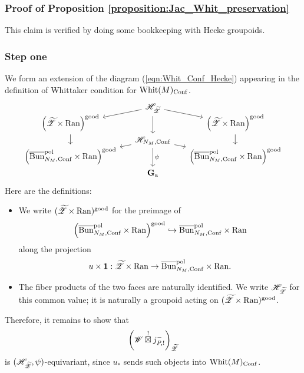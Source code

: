 \subsubsection{Proof of Proposition \ref{proposition:Jac_Whit_preservation}} This claim is verified by doing some bookkeeping with Hecke groupoids.

\subsubsection{Step one} We form an extension of the diagram (\ref{eqn:Whit_Conf_Hecke}) appearing in the definition of Whittaker condition for $\mathrm{Whit}(M)_{\mathrm{Conf}}$.
\[
\begin{tikzcd}[
  column sep={10em,between origins},
  row sep={2em,between origins}
]
    & \HH_\ZZt \arrow[dl] \arrow[dr] \arrow[dd] & \\
    \left(\ZZt \times \Ran \right)^\good \arrow[dd] & & \left(\ZZt \times \Ran \right)^\good \arrow[dd] \\
    & \HH_{N_M, \Conf} \arrow[dl] \arrow[dr] \arrow[dd, "\psi"] & \\
    \left(\Bunc_{N_M, \Conf}^\pol \times \Ran \right)^\good & & \left(\Bunc_{N_M, \Conf}^\pol \times \Ran \right)^\good \\
    & \Ga &
\end{tikzcd}
\]
Here are the definitions:
\begin{itemize}
    \item We write $({\widetilde{\mathscr{Z}}} \times \mathrm{Ran})^{\mathrm{good}}$ for the preimage of
        \[
        \left(\overline{\mathrm{Bun}}_{N_M, \mathrm{Conf}}^{\mathrm{pol}} \times \mathrm{Ran} \right)^{\mathrm{good}} \hookrightarrow \overline{\mathrm{Bun}}_{N_M, \mathrm{Conf}}^{\mathrm{pol}} \times \mathrm{Ran}
        \]
    along the projection
        \[u \times \mathbf{1} : {\widetilde{\mathscr{Z}}} \times \mathrm{Ran} \to \overline{\mathrm{Bun}}_{N_M,\mathrm{Conf}}^{\mathrm{pol}} \times \mathrm{Ran}.\]
    \item The fiber products of the two faces are naturally identified. We write $\mathscr{H}_{\widetilde{\mathscr{Z}}}$ for this common value; it is naturally a groupoid acting on $({\widetilde{\mathscr{Z}}} \times \mathrm{Ran})^{\mathrm{good}}$.
\end{itemize}
Therefore, it remains to show that
    \[\left(\mathscr{W} \overset{!}{\boxtimes} j_{P,!}^-\right)_{\widetilde{\mathscr{Z}}}\]
is $(\mathscr{H}_{\widetilde{\mathscr{Z}}}, \psi)$-equivariant, since $u_*$ sends such objects into $\mathrm{Whit}(M)_{\mathrm{Conf}}$.

